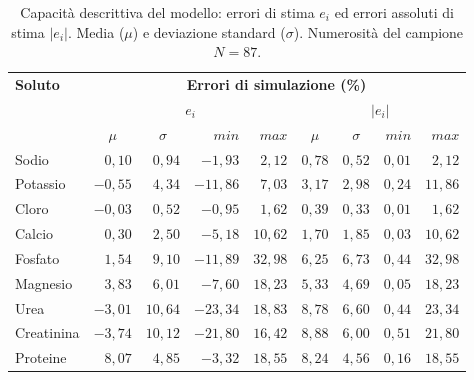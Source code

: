 \documentclass[10pt,twoside]{book}
\begin{document}
\begin{table}[htb]
	\centering
	\caption{Capacità descrittiva del modello: errori di stima $e_i$ ed errori assoluti di stima $|e_i|$. Media ($\mu$) e deviazione standard ($\sigma$). Numerosità del campione $N=87$.}\label{tab:descrizione}
	\begin{tabular}{lrrrrrrrr}
	\toprule 
		\textbf{Soluto}   &  \multicolumn{8}{c}{\textbf{Errori di simulazione (\%)}}  \\
		\cmidrule(lr){2-9}
				              &        \multicolumn{4}{c}{$e_i$}             &       \multicolumn{4}{c}{$|e_i|$}             \\
		                  & \multicolumn{1}{c}{$\mu$}      & \multicolumn{1}{c}{$\sigma$}   & $min$   & $max$   & \multicolumn{1}{c}{$\mu$}     & \multicolumn{1}{c}{$\sigma$}   & $min$   & $max$  \\
    \cmidrule(lr){2-5}\cmidrule(lr){6-9}
  	Sodio             & $ 0,10$     & $ 0,94$    & $ -1,93$  & $2,12$  & $0,78$   & $0,52$     & $0,01$ & $ 2,12$   \\
  	Potassio          & $-0,55$     & $ 4,34$    & $-11,86$  & $7,03$  & $3,17$   & $2,98$     & $0,24$ & $11,86$  \\
  	Cloro             & $-0,03$     & $ 0,52$    & $ -0,95$  & $1,62$  & $0,39$   & $0,33$     & $0,01$ & $ 1,62$   \\
  	Calcio            & $ 0,30$     & $ 2,50$    & $ -5,18$  & $10,62$ & $1,70$   & $1,85$     & $0,03$ & $10,62$  \\
  	Fosfato           & $ 1,54$     & $ 9,10$    & $-11,89$  & $32,98$ & $6,25$   & $6,73$     & $0,44$ & $32,98$  \\
  	Magnesio          & $ 3,83$     & $ 6,01$    & $ -7,60$  & $18,23$ & $5,33$   & $4,69$     & $0,05$ & $18,23$  \\
  	Urea              & $-3,01$     & $10,64$    & $-23,34$  & $18,83$ & $8,78$   & $6,60$     & $0,44$ & $23,34$  \\
  	Creatinina        & $-3,74$     & $10,12$    & $-21,80$  & $16,42$ & $8,88$   & $6,00$     & $0,51$ & $21,80$  \\
  	Proteine          & $ 8,07$     & $ 4,85$    & $ -3,32$  & $18,55$ & $8,24$   & $4,56$     & $0,16$ & $18,55$  \\
  \bottomrule
\end{tabular}
\end{table}
\end{document}
